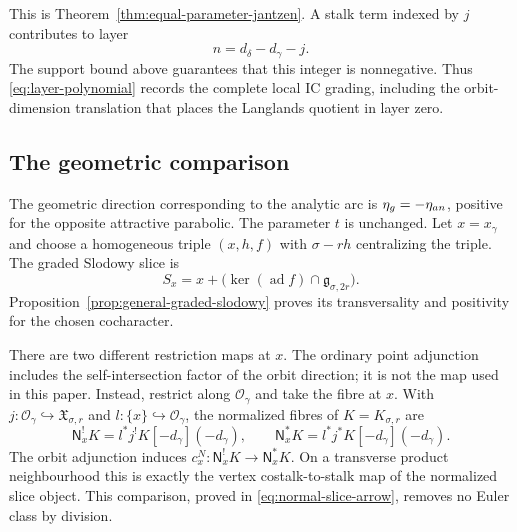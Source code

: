 \documentclass[10pt,a4paper]{amsart}
\begin{document}
This is Theorem~\ref{thm:equal-parameter-jantzen}.  A stalk term indexed by
$j$ contributes to layer
\[
 n=d_\delta-d_\gamma-j.
\]
The support bound above guarantees that this integer is nonnegative.  Thus
\eqref{eq:layer-polynomial} records the complete local IC grading,
including the orbit-dimension translation that places the Langlands quotient
in layer zero.

\subsection*{The geometric comparison}

The geometric direction corresponding to the analytic arc is
$\eta_{\rm g}=-\eta_{\rm an}$, positive for the opposite attractive
parabolic.  The parameter $t$ is unchanged.  Let $x=x_\gamma$ and choose
a homogeneous triple $(x,h,f)$ with $\sigma-rh$ centralizing the triple.
The graded Slodowy slice is
\[
 S_x=x+\bigl(\ker(\operatorname{ad}f)\cap\mathfrak g_{\sigma,2r}\bigr).
\]
Proposition~\ref{prop:general-graded-slodowy} proves its transversality
and positivity for the chosen cocharacter.

There are two different restriction maps at $x$.  The ordinary point
adjunction includes the self-intersection factor of the orbit direction;
it is not the map used in this paper.  Instead, restrict along
$\mathcal O_\gamma$ and take the fibre at $x$.  With $j:\mathcal O_\gamma
\hookrightarrow\mathfrak X_{\sigma,r}$ and $l:\{x\}\hookrightarrow
\mathcal O_\gamma$, the normalized fibres of $K=K_{\sigma,r}$ are
\[
 \mathsf N_x^!K=l^*j^!K[-d_\gamma](-d_\gamma),\qquad
 \mathsf N_x^*K=l^*j^*K[-d_\gamma](-d_\gamma).
\]
The orbit adjunction induces $c_x^N:\mathsf N_x^!K\to\mathsf N_x^*K$.
On a transverse product neighbourhood this is exactly the vertex
costalk-to-stalk map of the normalized slice object.  This comparison,
proved in \eqref{eq:normal-slice-arrow}, removes no Euler class by
division.
\end{document}
